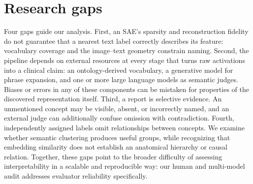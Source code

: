 \section{Research gaps}
Four gaps guide our analysis. First, an SAE's sparsity and reconstruction fidelity do not guarantee that a nearest text label correctly describes its feature: vocabulary coverage and the image--text geometry constrain naming. Second, the pipeline depends on external resources at every stage that turns raw activations into a clinical claim: an ontology-derived vocabulary, a generative model for phrase expansion, and one or more large language models as semantic judges. Biases or errors in any of these components can be mistaken for properties of the discovered representation itself. Third, a report is selective evidence. An unmentioned concept may be visible, absent, or incorrectly named, and an external judge can additionally confuse omission with contradiction. Fourth, independently assigned labels omit relationships between concepts. We examine whether semantic clustering produces useful groups, while recognizing that embedding similarity does not establish an anatomical hierarchy or causal relation. Together, these gaps point to the broader difficulty of assessing interpretability in a scalable and reproducible way: our human and multi-model audit addresses evaluator reliability specifically.